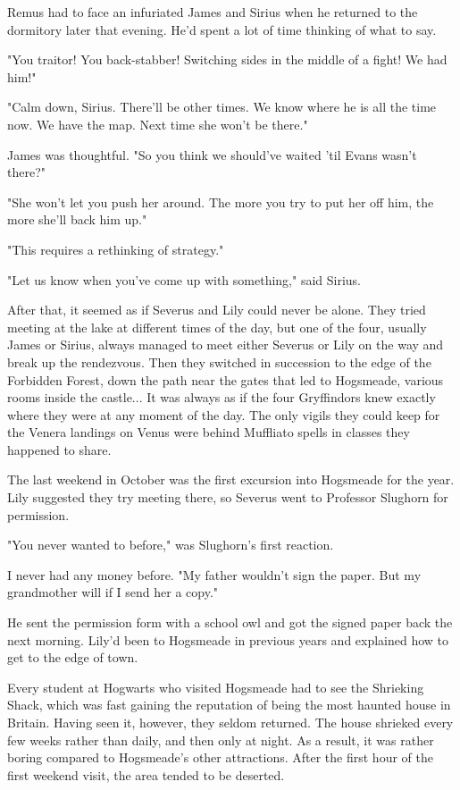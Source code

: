 Remus had to face an infuriated James and Sirius when he returned to the dormitory later that evening. He'd spent a lot of time thinking of what to say.

"You traitor! You back-stabber! Switching sides in the middle of a fight! We had him!"

"Calm down, Sirius. There'll be other times. We know where he is all the time now. We have the map. Next time she won't be there."

James was thoughtful. "So you think we should've waited 'til Evans wasn't there?"

"She won't let you push her around. The more you try to put her off him, the more she'll back him up."

"This requires a rethinking of strategy."

"Let us know when you've come up with something," said Sirius.

After that, it seemed as if Severus and Lily could never be alone. They tried meeting at the lake at different times of the day, but one of the four, usually James or Sirius, always managed to meet either Severus or Lily on the way and break up the rendezvous. Then they switched in succession to the edge of the Forbidden Forest, down the path near the gates that led to Hogsmeade, various rooms inside the castle... It was always as if the four Gryffindors knew exactly where they were at any moment of the day. The only vigils they could keep for the Venera landings on Venus were behind Muffliato spells in classes they happened to share.

The last weekend in October was the first excursion into Hogsmeade for the year. Lily suggested they try meeting there, so Severus went to Professor Slughorn for permission.

"You never wanted to before," was Slughorn's first reaction.

I never had any money before. "My father wouldn't sign the paper. But my grandmother will if I send her a copy."

He sent the permission form with a school owl and got the signed paper back the next morning. Lily'd been to Hogsmeade in previous years and explained how to get to the edge of town.

Every student at Hogwarts who visited Hogsmeade had to see the Shrieking Shack, which was fast gaining the reputation of being the most haunted house in Britain. Having seen it, however, they seldom returned. The house shrieked every few weeks rather than daily, and then only at night. As a result, it was rather boring compared to Hogsmeade's other attractions. After the first hour of the first weekend visit, the area tended to be deserted.

